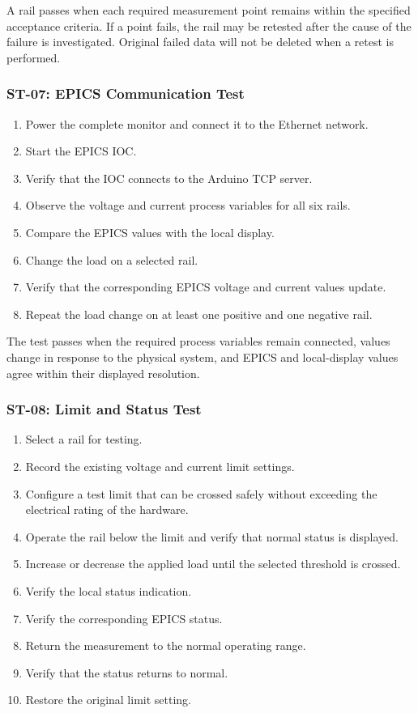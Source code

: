 A rail passes when each required measurement point remains within the specified
acceptance criteria. If a point fails, the rail may be retested after the cause of
the failure is investigated. Original failed data will not be deleted when a retest
is performed.

\subsubsection{ST-07: EPICS Communication Test}

\begin{enumerate}
	\item Power the complete monitor and connect it to the Ethernet network.
	\item Start the EPICS IOC.
	\item Verify that the IOC connects to the Arduino TCP server.
	\item Observe the voltage and current process variables for all six rails.
	\item Compare the EPICS values with the local display.
	\item Change the load on a selected rail.
	\item Verify that the corresponding EPICS voltage and current values update.
	\item Repeat the load change on at least one positive and one negative rail.
\end{enumerate}

The test passes when the required process variables remain connected, values change
in response to the physical system, and EPICS and local-display values agree within
their displayed resolution.

\subsubsection{ST-08: Limit and Status Test}

\begin{enumerate}
	\item Select a rail for testing.
	\item Record the existing voltage and current limit settings.
	\item Configure a test limit that can be crossed safely without exceeding the
	electrical rating of the hardware.
	\item Operate the rail below the limit and verify that normal status is displayed.
	\item Increase or decrease the applied load until the selected threshold is crossed.
	\item Verify the local status indication.
	\item Verify the corresponding EPICS status.
	\item Return the measurement to the normal operating range.
	\item Verify that the status returns to normal.
	\item Restore the original limit setting.
\end{enumerate}

